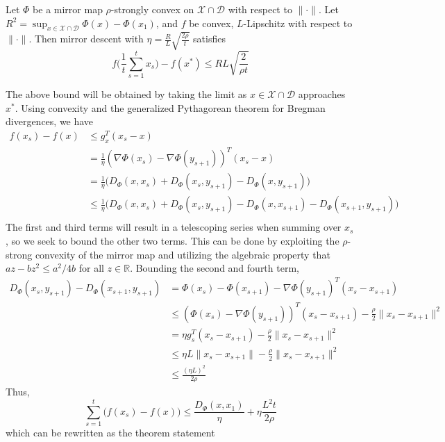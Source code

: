 \begin{theorem}
Let $\Phi$ be a mirror map $\rho$-strongly convex on $\mathcal{X} \cap \mathcal{D}$ with respect to $\|\cdot\|$. Let $R^2 = \sup_{x \in \mathcal{X}\cap \mathcal{D}} \Phi(x) - \Phi(x_1)$, and $f$ be convex, $L$-Lipschitz with respect to $\|\cdot\|$. Then mirror descent with $\eta = \frac{R}{L}\sqrt{\frac{2\rho}{t}}$ satisfies
\begin{equation}
f\Big(\frac{1}{t}\sum_{s=1}^t x_s\Big) - f(x^*) \leq RL\sqrt{\frac{2}{\rho t}}
\end{equation}
\end{theorem}
\proofstart The above bound will be obtained by taking the limit as $x \in \mathcal{X} \cap \mathcal{D}$ approaches $x^*$. Using convexity and the generalized Pythagorean theorem for Bregman divergences, we have
\begin{align*}
    f(x_s)-f(x) &\leq g_x^T(x_s - x) \\
    &= \frac{1}{\eta} (\nabla \Phi(x_s) - \nabla \Phi(y_{s+1}))^T(x_s - x) \\
    &= \frac{1}{\eta}\Big(D_{\Phi}(x,x_s) + D_{\Phi}(x_s,y_{s+1}) - D_{\Phi}(x,y_{s+1})\Big)\\
    &\leq \frac{1}{\eta}\Big(D_{\Phi}(x,x_s) + D_{\Phi}(x_s,y_{s+1}) - D_{\Phi}(x,x_{s+1}) - D_{\Phi}(x_{s+1},y_{s+1}) \Big)\\
\end{align*}
The first and third terms will result in a telescoping series when summing over $x_s$, so we seek to bound the other two terms. This can be done by exploiting the $\rho$-strong convexity of the mirror map and utilizing the algebraic property that $az - bz^2 \leq a^2/4b$ for all $z \in \mathbb{R}$. Bounding the second and fourth term,
\begin{align*}
    D_{\Phi}(x_s,y_{s+1}) - D_{\Phi}(x_{s+1},y_{s+1}) &= \Phi(x_s) - \Phi(x_{s+1}) - \nabla \Phi(y_{s+1})^T(x_s - x_{s+1}) \\
    &\leq (\Phi(x_s) -\nabla \Phi(y_{s+1}))^T(x_s - x_{s+1}) - \frac{\rho}{2}\|x_s - x_{s+1}\|^2\\
    &= \eta g_s^T(x_s - x_{s+1}) - \frac{\rho}{2}\|x_s - x_{s+1}\|^2\\
    &\leq \eta L \|x_s - x_{s+1}\| - \frac{\rho}{2}\|x_s - x_{s+1}\|^2\\
    &\leq \frac{(\eta L)^2}{2\rho}
\end{align*}
Thus,
$$\sum_{s=1}^t \Big(f(x_s) - f(x)\Big) \leq \frac{D_{\Phi}(x,x_{1})}{\eta} + \eta \frac{L^2 t}{2\rho}$$
which can be rewritten as the theorem statement \proofend 

